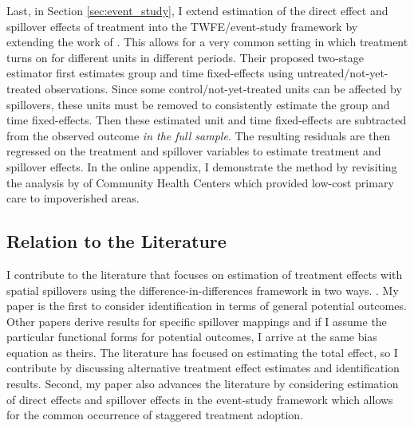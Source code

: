 \documentclass[11pt]{article}
\begin{document}
Last, in Section \ref{sec:event_study}, I extend estimation of the direct effect and spillover effects of treatment into the TWFE/event-study framework by extending the work of \citet{Gardner_2021}. This allows for a very common setting in which treatment turns on for different units in different periods. Their proposed two-stage estimator first estimates group and time fixed-effects using untreated/not-yet-treated observations. Since some control/not-yet-treated units can be affected by spillovers, these units must be removed to consistently estimate the group and time fixed-effects. Then these estimated unit and time fixed-effects are subtracted from the observed outcome \emph{in the full sample}. The resulting residuals are then regressed on the treatment and spillover variables to estimate treatment and spillover effects. In the online appendix, I demonstrate the method by revisiting the analysis by \citet{Bailey_Goodman_Bacon_2015} of Community Health Centers which provided low-cost primary care to impoverished areas.

\subsection{Relation to the Literature} 

I contribute to the literature that focuses on estimation of treatment effects with spatial spillovers using the difference-in-differences framework in two ways. \citep{Clarke_2017,Berg_Streitz_2019,Verbitsky-Savitz_Raudenbush_2012,Delgado_Florax_2015}. My paper is the first to consider identification in terms of general potential outcomes. Other papers derive results for specific spillover mappings and if I assume the particular functional forms for potential outcomes, I arrive at the same bias equation as theirs. The literature has focused on estimating the total effect, so I contribute by discussing alternative treatment effect estimates and identification results. Second, my paper also advances the literature by considering estimation of direct effects and spillover effects in the event-study framework which allows for the common occurrence of staggered treatment adoption.
\end{document}
